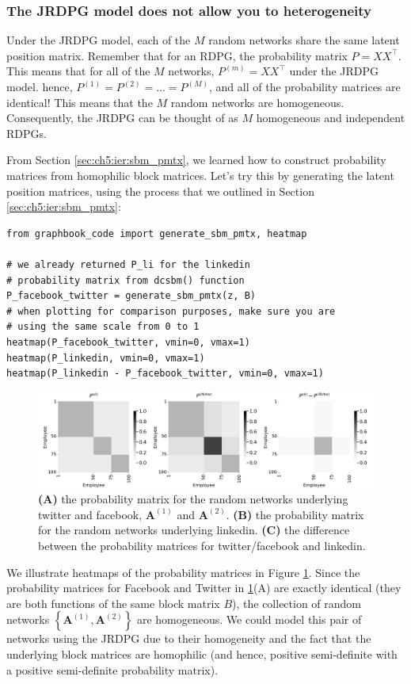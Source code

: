 \subsubsection{The JRDPG model does not allow you to heterogeneity}

Under the JRDPG model, each of the $M$ random networks share the same latent position matrix. Remember that for an RDPG, the probability matrix $P = XX^\top$. This means that for all of the $M$ networks, $P^{(m)} = XX^\top$ under the JRDPG model. hence, $P^{(1)} = P^{(2)} = ... = P^{(M)}$, and {all} of the probability matrices are {identical}! This means that the $M$ random networks are {homogeneous}. Consequently, the JRDPG can be thought of as $M$ homogeneous and independent RDPGs.

From Section \ref{sec:ch5:ier:sbm_pmtx}, we learned how to construct probability matrices from homophilic block matrices. Let's try this by generating the latent position matrices, using the process that we outlined in Section \ref{sec:ch5:ier:sbm_pmtx}:

\begin{lstlisting}[style=python]
from graphbook_code import generate_sbm_pmtx, heatmap

# we already returned P_li for the linkedin
# probability matrix from dcsbm() function
P_facebook_twitter = generate_sbm_pmtx(z, B)
# when plotting for comparison purposes, make sure you are
# using the same scale from 0 to 1
heatmap(P_facebook_twitter, vmin=0, vmax=1)
heatmap(P_linkedin, vmin=0, vmax=1)
heatmap(P_linkedin - P_facebook_twitter, vmin=0, vmax=1)
\end{lstlisting}

\begin{figure}[h]
    \centering
    \includegraphics[width=\linewidth]{representations/ch5/Images/het.png}
    \caption[Heterogeneous random network probability matrices]{\textbf{(A)} the probability matrix for the random networks underlying twitter and facebook, $\mathbf A^{(1)}$ and $\mathbf A^{(2)}$. \textbf{(B)} the probability matrix for the random networks underlying linkedin. \textbf{(C)} the difference between the probability matrices for twitter/facebook and linkedin.}
    \label{fig:ch5:het}
\end{figure}
We illustrate heatmaps of the probability matrices in Figure \ref{fig:ch5:het}. Since the probability matrices for Facebook and Twitter in \ref{fig:ch5:het}(A) are exactly identical (they are both functions of the same block matrix $B$), the collection of random networks $\left\{\mathbf A^{(1)}, \mathbf A^{(2)}\right\}$ are homogeneous. We could model this pair of networks using the JRDPG due to their homogeneity and the fact that the underlying block matrices are homophilic (and hence, positive semi-definite with a positive semi-definite probability matrix).

